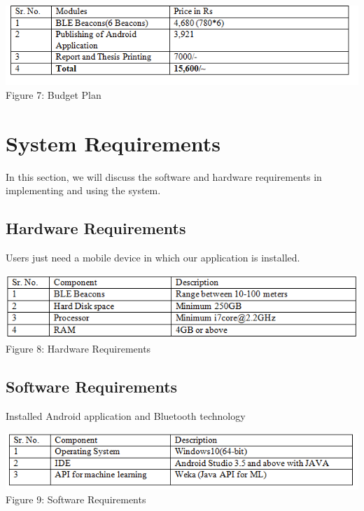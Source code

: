 \documentclass{article}
\begin{document}
\begin{center}
\includegraphics[scale=0.8]{table3}
\\Figure 7: Budget Plan
\end{center}
\section{System Requirements}

In this section, we will discuss the software and hardware requirements in implementing and using the system.
\subsection{Hardware Requirements}
Users just need a mobile device in which our application is installed.
\begin{center}
\includegraphics[scale=0.8]{table2}
\\Figure 8: Hardware Requirements
\end{center}
\subsection{Software Requirements}
Installed Android application and Bluetooth technology 

\begin{center}
\includegraphics[scale=0.8]{table1}
\\Figure 9: Software Requirements
\end{center}
\end{document}
